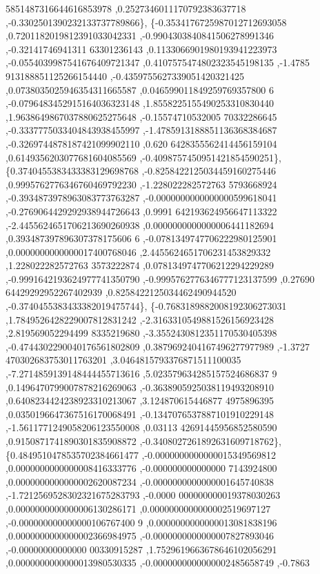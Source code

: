 \begin{DoxyCode}
      5851487316644616853978 ,0.2527346011170792383637718 ,-0.3302501390232133737789866\},
\{-0.3534176725987012712693058 ,0.7201182019812391033042331 ,-0.9904303840841506278991346 ,-0.32141746941311
      63301236143 ,0.1133066901980193941223973 ,-0.0554039987541676409721347 ,0.4107575474802323545198135 ,-1.4785
      913188851125266154440 ,-0.4359755627339051420321425 ,0.0738035025946354311665587 ,0.046599011849259769357800
      6 ,-0.0796483452915164036323148 ,1.8558225155490253310830440 ,1.9638649867037880625275648 ,-0.15574710532005
      70332286645 ,-0.3337775033404843938455997 ,-1.4785913188851136368384687 ,-0.3269744878187421099902110 ,0.620
      6428355562414456159104 ,0.6149356203077681604085569 ,-0.4098757450951421854590251\},
\{0.3740455383433383129698768 ,-0.8258422125034459160275446 ,0.9995762776346760469792230 ,-1.228022282572763
      5793668924 ,-0.3934873978963083773763287 ,-0.0000000000000000599618041 ,-0.2769064429292938944726643 ,0.9991
      642193624956647113322 ,-2.4455624651706213690260938 ,0.0000000000000006441182694 ,0.393487397896307378175606
      6 ,-0.0781349747706222980125901 ,0.0000000000000017400768046 ,2.4455624651706231453829332 ,1.228022282572763
      3573222874 ,0.0781349747706212294229289 ,-0.9991642193624977741350790 ,-0.9995762776346777123137599 ,0.27690
      64429292952267402939 ,0.8258422125034462490944520 ,-0.3740455383433382019475744\},
\{-0.7683189882008192306273031 ,1.7849526428229007812831242 ,-2.3163310549881526156923428 ,2.819569052294499
      8335219680 ,-3.3552430812351170530405398 ,-0.4744302290040176561802809 ,0.3879692404167496277977989 ,-1.3727
      470302683753011763201 ,3.0464815793376871511100035 ,-7.2714859139148444455713616 ,5.023579634285157524686837
      9 ,0.1496470799007878216269063 ,-0.3638905925038119493208910 ,0.6408234424238923310213067 ,3.124870615446877
      4975896395 ,0.0350196647367516170068491 ,-0.1347076537887101910229148 ,-1.5611771249058206123550008 ,0.03113
      42691445956852580590 ,0.9150871741890301835908872 ,-0.3408027261892631609718762\},
\{0.4849510478535702384661477 ,-0.0000000000000015349569812 ,0.0000000000000008416333776 ,-0.000000000000000
      7143924800 ,0.0000000000000002620087234 ,-0.0000000000000001645740838 ,-1.7212569528302321675283793 ,-0.0000
      000000000019378030263 ,0.0000000000000006130286171 ,0.0000000000000002519697127 ,-0.000000000000000106767400
      9 ,0.0000000000000013081838196 ,0.0000000000000002366984975 ,-0.0000000000000007827893046 ,-0.00000000000000
      00330915287 ,1.7529619663678646102056291 ,0.0000000000000013980530335 ,-0.0000000000000002485658749 ,-0.7863

\end{DoxyCode}
